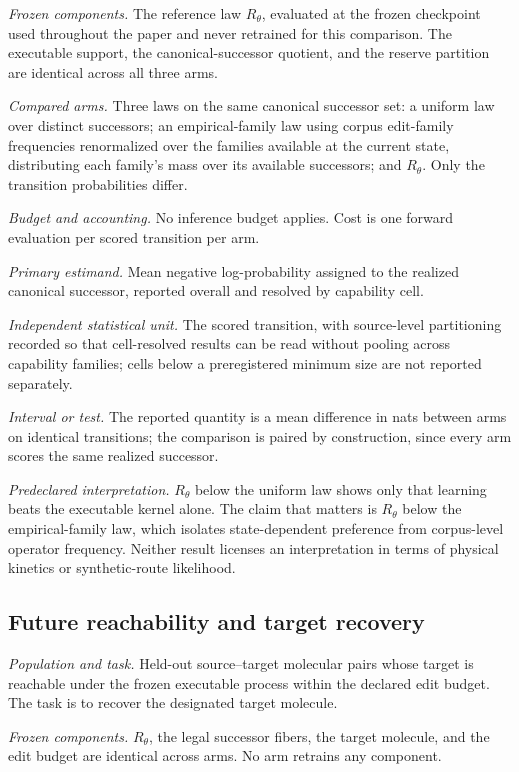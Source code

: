 \emph{Frozen components.} The reference law $R_\theta$, evaluated at the frozen checkpoint used throughout the paper and never retrained for this comparison. The executable support, the canonical-successor quotient, and the reserve partition are identical across all three arms.

\emph{Compared arms.} Three laws on the same canonical successor set: a uniform law over distinct successors; an empirical-family law using corpus edit-family frequencies renormalized over the families available at the current state, distributing each family's mass over its available successors; and $R_\theta$. Only the transition probabilities differ.

\emph{Budget and accounting.} No inference budget applies. Cost is one forward evaluation per scored transition per arm.

\emph{Primary estimand.} Mean negative log-probability assigned to the realized canonical successor, reported overall and resolved by capability cell.

\emph{Independent statistical unit.} The scored transition, with source-level partitioning recorded so that cell-resolved results can be read without pooling across capability families; cells below a preregistered minimum size are not reported separately.

\emph{Interval or test.} The reported quantity is a mean difference in nats between arms on identical transitions; the comparison is paired by construction, since every arm scores the same realized successor.

\emph{Predeclared interpretation.} $R_\theta$ below the uniform law shows only that learning beats the executable kernel alone. The claim that matters is $R_\theta$ below the empirical-family law, which isolates state-dependent preference from corpus-level operator frequency. Neither result licenses an interpretation in terms of physical kinetics or synthetic-route likelihood.

\subsection{Future reachability and target recovery}
\label{app:proto-lookahead}

\emph{Population and task.} Held-out source--target molecular pairs whose target is reachable under the frozen executable process within the declared edit budget. The task is to recover the designated target molecule.

\emph{Frozen components.} $R_\theta$, the legal successor fibers, the target molecule, and the edit budget are identical across arms. No arm retrains any component.

